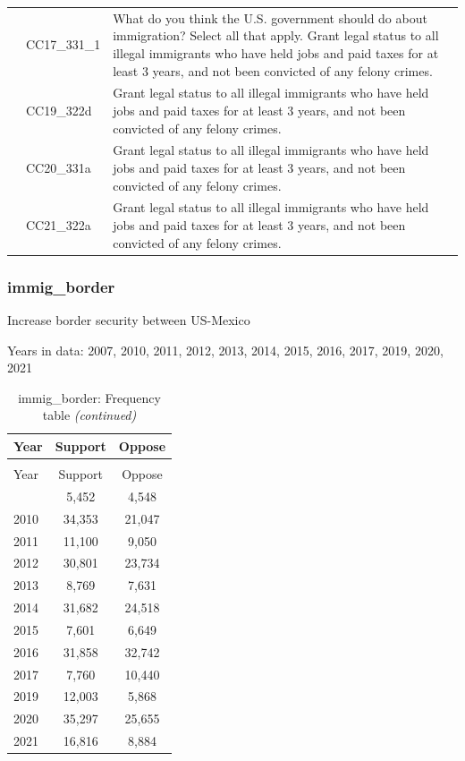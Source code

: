 \documentclass[
  12pt]{article}
\begin{document}
\begin{longtable}[t]{rl>{\raggedright\arraybackslash}p{10cm}}
\addlinespace
2017 & CC17\_331\_1 & What do you think the U.S. government should do about immigration? Select all that apply. Grant legal status to all illegal immigrants who have held jobs and paid taxes for at least 3 years, and not been convicted of any felony crimes.\\
\addlinespace
2019 & CC19\_322d & Grant legal status to all illegal immigrants who have held jobs and paid taxes for at least 3 years, and not been convicted of any felony crimes.\\
\addlinespace
2020 & CC20\_331a & Grant legal status to all illegal immigrants who have held jobs and paid taxes for at least 3 years, and not been convicted of any felony crimes.\\
\addlinespace
2021 & CC21\_322a & Grant legal status to all illegal immigrants who have held jobs and paid taxes for at least 3 years, and not been convicted of any felony crimes.\\*
\end{longtable}
\endgroup{}

\hypertarget{immig_border}{%
\subsubsection{immig\_border}\label{immig_border}}

Increase border security between US-Mexico

Years in data: 2007, 2010, 2011, 2012, 2013, 2014, 2015, 2016, 2017,
2019, 2020, 2021\begingroup\fontsize{10}{12}\selectfont

\begin{longtable}[t]{lcc}
\caption{\label{tab:unnamed-chunk-5}immig\_border: Frequency table}\\
\toprule
Year & Support & Oppose\\
\midrule
\endfirsthead
\caption[]{immig\_border: Frequency table \textit{(continued)}}\\
\toprule
Year & Support & Oppose\\
\midrule
\endhead

\endfoot
\bottomrule
\endlastfoot
2007 & 5,452 & 4,548\\
2010 & 34,353 & 21,047\\
2011 & 11,100 & 9,050\\
2012 & 30,801 & 23,734\\
2013 & 8,769 & 7,631\\
2014 & 31,682 & 24,518\\
2015 & 7,601 & 6,649\\
2016 & 31,858 & 32,742\\
2017 & 7,760 & 10,440\\
2019 & 12,003 & 5,868\\
2020 & 35,297 & 25,655\\
2021 & 16,816 & 8,884\\*
\end{longtable}
\endgroup{}
\end{document}
